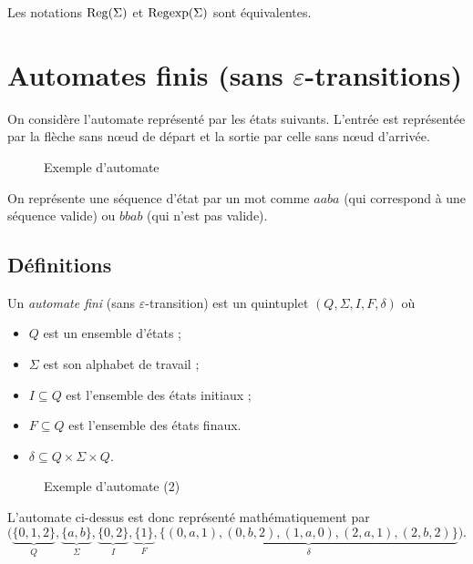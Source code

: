 \begin{rmk}[Notation]
	Les notations $\operatorname{Reg}(\Sigma)$\/ et ${\operatorname{Reg}}{\exp}(\Sigma)$ sont équivalentes.
\end{rmk}

\section{Automates finis (sans $\varepsilon$-transitions)}

On considère l'automate représenté par les états suivants. L'entrée est représentée par la flèche sans nœud de départ et la sortie par celle sans nœud d'arrivée.
\begin{figure}[H]
	\centering
	\caption{Exemple d'automate}
\end{figure}
On représente une séquence d'état par un mot comme $aaba$\/ (qui correspond à une séquence valide) ou $bbab$\/ (qui n'est pas valide).

\subsection{Définitions}

\begin{defn}
	Un {\it automate fini}\/ (sans $\varepsilon$-transition) est un quintuplet $(Q, \Sigma, I, F, \delta)$\/ où
	\begin{itemize}
		\item $Q$\/ est un ensemble d'états ;
		\item $\Sigma$\/ est son alphabet de travail ;
		\item $I \subseteq Q$\/ est l'ensemble des états initiaux ;
		\item $F \subseteq Q$\/ est l'ensemble des états finaux.
		\item $\delta \subseteq Q \times \Sigma \times Q$.
	\end{itemize}
\end{defn}

\begin{figure}[H]
	\centering
	\caption{Exemple d'automate (2)}
\end{figure}

\begin{exm}
	L'automate ci-dessus est donc représenté mathématiquement par \[
		\Big(\underbrace{\{0,1,2\}}_Q, \underbrace{\{a,b\}}_\Sigma,\underbrace{\{0,2\}}_I,\underbrace{\{1\}}_F,\underbrace{\big\{(0,a,1),(0,b,2),(1,a,0),(2,a,1),(2,b,2)\big\}}_{\delta}\Big)
	.\]
\end{exm}

